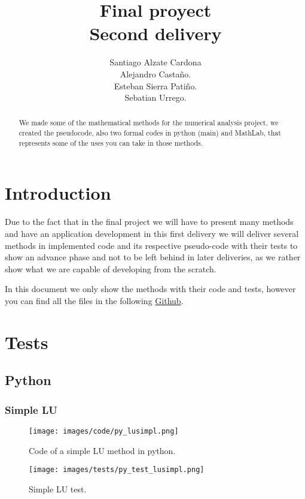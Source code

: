 \documentclass{article}
\title{\textbf{Final proyect} \\
        Second delivery}
\author{Santiago Alzate Cardona\\
        Alejandro Castaño.\\
        Esteban Sierra Patiño.\\
        Sebatian Urrego.}
\begin{document}
\maketitle

\begin{abstract}
We made some of the mathematical methods for the numerical analysis project, we created the pseudocode, also two formal codes in python (main) and MathLab, that represents some of the uses you can take in those methods.
\end{abstract}

\section{Introduction}

Due to the fact that in the final project we will have to present many methods and have an application development in this first delivery we will deliver several methods in implemented code and its respective pseudo-code with their tests to show an advance phase and not to be left behind in later deliveries, as we rather show what we are capable of developing from the scratch.

In this document we only show the methods with their code and tests, however you can find all the files in the following \href{https://github.com/tali0517/Analisis-numerico}{Github}.

\section{Tests}

\subsection{Python}

\subsubsection{Simple LU}
\begin{figure}[ht]
\centering
\texttt{[image: images/code/py\_lusimpl.png]}
\caption{\label{fig:py_bisc}Code of a simple LU method in python.}
\end{figure}
\FloatBarrier
\begin{figure}[ht]
\centering
\texttt{[image: images/tests/py\_test\_lusimpl.png]}
\caption{\label{fig:py_bisc}Simple LU test.}
\end{figure}
\FloatBarrier
\end{document}
